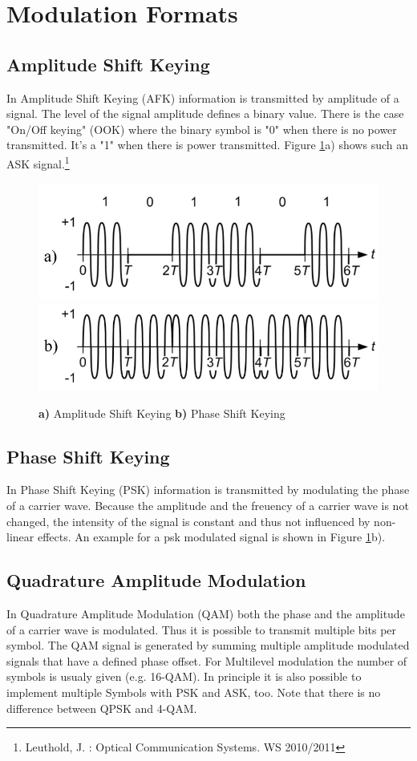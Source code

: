 \section{Modulation Formats}
\subsection{Amplitude Shift Keying}
In Amplitude Shift Keying (AFK) information is transmitted by amplitude of a signal. The level of the signal amplitude defines a binary value. There is the case "On/Off keying" (OOK) where the binary symbol is "0" when there is no power transmitted. It's a "1" when there is power transmitted. 
Figure \ref{fig:ask}a) shows such an ASK signal.\footnote[1]{Leuthold, J. : Optical Communication Systems. WS 2010/2011}

\begin{figure}
  \centering
  \includegraphics[width=.5\columnwidth]{Grafiken/OOK.jpg}
	\includegraphics[width=.5\columnwidth]{Grafiken/PSK.jpg}%
\caption{\textbf{a)} Amplitude Shift Keying \textbf{b)} Phase Shift Keying}
\label{fig:ask}
\end{figure}



\subsection{Phase Shift Keying}
In Phase Shift Keying (PSK) information is transmitted by modulating the phase of a carrier wave. Because the amplitude and the freuency of a carrier wave is not changed, the intensity of the signal is constant and thus not influenced by non-linear effects. An example for a psk modulated signal is shown in Figure \ref{fig:ask}b).\footnotemark[1]
\subsection{Quadrature Amplitude Modulation}
In Quadrature Amplitude Modulation (QAM) both the phase and the amplitude of a carrier wave is modulated. Thus it is possible to transmit multiple bits per symbol. The QAM signal is generated by summing multiple amplitude modulated signals that have a defined phase offset. For Multilevel modulation the number of symbols is usualy given (e.g. 16-QAM). In principle it is also possible to implement multiple Symbols with PSK and ASK, too. Note that there is no difference between QPSK and 4-QAM.\footnotemark[1]
